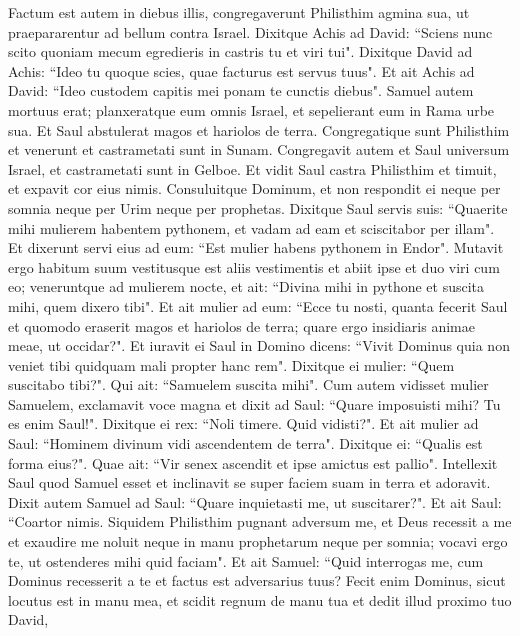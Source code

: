 \begin{biblechapter}   
\verse Factum est autem in diebus illis, congregaverunt Philisthim agmina sua, ut praepararentur ad bellum contra Israel. Dixitque Achis ad David: “Sciens nunc scito quoniam mecum egredieris in castris tu et viri tui". 
\verse Dixitque David ad Achis: “Ideo tu quoque scies, quae facturus est servus tuus". Et ait Achis ad David: “Ideo custodem capitis mei ponam te cunctis diebus". 
\verse Samuel autem mortuus erat; planxeratque eum omnis Israel, et sepelierant eum in Rama urbe sua. Et Saul abstulerat magos et hariolos de terra. 
\verse Congregatique sunt Philisthim et venerunt et castrametati sunt in Sunam. Congregavit autem et Saul universum Israel, et castrametati sunt in Gelboe.  
\verse Et vidit Saul castra Philisthim et timuit, et expavit cor eius nimis. 
\verse Consuluitque Dominum, et non respondit ei neque per somnia neque per Urim neque per prophetas. 
\verse Dixitque Saul servis suis: “Quaerite mihi mulierem habentem pythonem, et vadam ad eam et sciscitabor per illam". Et dixerunt servi eius ad eum: “Est mulier habens pythonem in Endor". 
\verse Mutavit ergo habitum suum vestitusque est aliis vestimentis et abiit ipse et duo viri cum eo; veneruntque ad mulierem nocte, et ait: “Divina mihi in pythone et suscita mihi, quem dixero tibi". 
\verse Et ait mulier ad eum: “Ecce tu nosti, quanta fecerit Saul et quomodo eraserit magos et hariolos de terra; quare ergo insidiaris animae meae, ut occidar?". 
\verse Et iuravit ei Saul in Domino dicens: “Vivit Dominus quia non veniet tibi quidquam mali propter hanc rem". 
\verse Dixitque ei mulier: “Quem suscitabo tibi?". Qui ait: “Samuelem suscita mihi". 
\verse Cum autem vidisset mulier Samuelem, exclamavit voce magna et dixit ad Saul: “Quare imposuisti mihi? Tu es enim Saul!". 
\verse Dixitque ei rex: “Noli timere. Quid vidisti?". Et ait mulier ad Saul: “Hominem divinum vidi ascendentem de terra". 
\verse Dixitque ei: “Qualis est forma eius?". Quae ait: “Vir senex ascendit et ipse amictus est pallio". Intellexit Saul quod Samuel esset et inclinavit se super faciem suam in terra et adoravit. 
\verse Dixit autem Samuel ad Saul: “Quare inquietasti me, ut suscitarer?". Et ait Saul: “Coartor nimis. Siquidem Philisthim pugnant adversum me, et Deus recessit a me et exaudire me noluit neque in manu prophetarum neque per somnia; vocavi ergo te, ut ostenderes mihi quid faciam". 
\verse Et ait Samuel: “Quid interrogas me, cum Dominus recesserit a te et factus est adversarius tuus?  
\verse Fecit enim Dominus, sicut locutus est in manu mea, et scidit regnum de manu tua et dedit illud proximo tuo David, 

\end{biblechapter}
